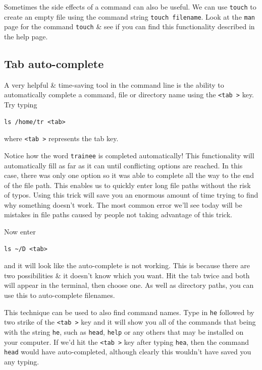 \begin{bonus}
Sometimes the side effects of a command can also be useful. 
We can use \texttt{touch} to create an empty file using the command string \texttt{touch filename}.
Look at the \texttt{man} page for the command \texttt{touch} \& see if you can find this functionality described in the help page. \\
\end{bonus}

\subsection{Tab auto-complete}
\begin{steps}
A very helpful \& time-saving tool in the command line is the ability to automatically complete a command, file or directory name using the \texttt{\textless tab \textgreater} key.
Try typing 
\begin{lstlisting}
ls /home/tr <tab>
\end{lstlisting}
where \texttt{\textless tab \textgreater} represents the tab key.
\end{steps}
\begin{information}
Notice how the word \texttt{trainee} is completed automatically!
This functionality will automatically fill as far as it can until conflicting options are reached.
In this case, there was only one option so it was able to complete all the way to the end of the file path. 
This enables us to quickly enter long file paths without the risk of typos. 
Using this trick will save you an enormous amount of time trying to find why something doesn't work.
The most common error we'll see today will be mistakes in file paths caused by people not taking advantage of this trick.\\
\end{information}

\begin{steps}
Now enter
\begin{lstlisting}
ls ~/D <tab>
\end{lstlisting}
and it will look like the auto-complete is not working.
This is because there are two possibilities \& it doesn't know which you want.
Hit the tab twice and both will appear in the terminal, then choose one.
As well as directory paths, you can use this to auto-complete filenames.
\end{steps}

\begin{advanced}
This technique can be used to also find command names.
Type in \texttt{he} followed by two strike of the \texttt{\textless tab \textgreater} key and it will show you all of the commands that being with the string \texttt{he}, such as \texttt{head}, \texttt{help} or any others that may be installed on your computer.
If we'd hit the \texttt{\textless tab \textgreater} key after typing \texttt{hea}, then the command \texttt{head} would have auto-completed, although clearly this wouldn't have saved you any typing.
\end{advanced}

